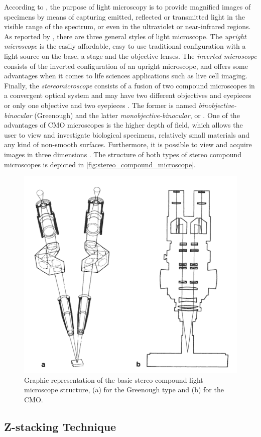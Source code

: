According to , the purpose of light microscopy is to provide magnified images of specimens by means of capturing emitted, reflected or transmitted light in the visible range of the spectrum, or even in the ultraviolet or near-infrared regions. As reported by , there are three general styles of light microscope. The \emph{upright microscope} is the easily affordable, easy to use traditional configuration with a light source on the base, a stage and the objective lenses. The \emph{inverted microscope} consists of the inverted configuration of an upright microscope, and offers some advantages when it comes to life sciences applications such as live cell imaging. Finally, the \emph{stereomicroscope} consists of a fusion of two compound microscopes in a convergent optical system and may have two different objectives and eyepieces or only one objective and two eyepieces \cite{schreier2004advances}. The former is named \emph{binobjective-binocular} (Greenough) and the latter \emph{monobjective-binocular}, or . One of the advantages of CMO microscopes is the higher depth of field, which allows the user to view and investigate biological specimens, relatively small materials and any kind of non-smooth surfaces. Furthermore, it is possible to view and acquire images in three dimensions \cite{rochow1994introduction}. The structure of both types of stereo compound microscopes is depicted in \autoref{fig:stereo_compound_microscope}.

\begin{figure}[htb]
	\centering
	\caption{\label{fig:stereo_compound_microscope} Graphic representation of the basic stereo compound light microscope structure, (a) for the Greenough type and (b) for the CMO.}
	\begin{center}
	    \includegraphics[scale=0.4]{images/stereomicroscope.png}
	\end{center}
	\centering
\end{figure}

\subsection{Z-stacking Technique}
